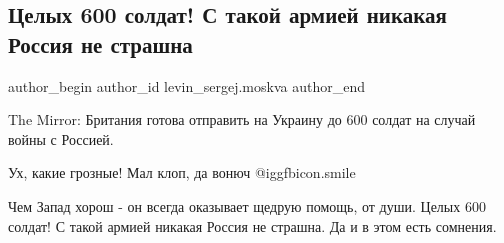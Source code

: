  
 
 
 
 
 
\subsection{Целых 600 солдат! С такой армией никакая Россия не страшна}
\label{sec:14_11_2021.fb.levin_sergej.moskva.1.600_soldat_rossia_britania}
 
\ifcmt
 author_begin
   author_id levin_sergej.moskva
 author_end
\fi

The Mirror: Британия готова отправить на Украину до 600 солдат на случай войны
с Россией. 

Ух, какие грозные! Мал клоп, да вонюч  @igg{fbicon.smile}  

Чем Запад хорош - он всегда оказывает щедрую помощь, от души. Целых 600 солдат!
С такой армией никакая Россия не страшна. Да и в этом есть сомнения.


